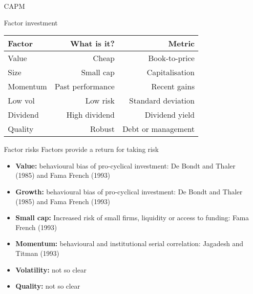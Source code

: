\documentclass[14pt,xcolor=pdftex,dvipsnames,table]{beamer}\usepackage[]{graphicx}\usepackage[]{color}
\begin{document}
\begin{frame}{CAPM}
\end{frame}

\begin{frame}{Factor investment}
\begin{table}
\begin{center}
\begin{tabular}{l r r }
\textbf{Factor} & \textbf{What is it?} & \textbf{Metric} \\
\hline
Value & Cheap & Book-to-price\\
Size & Small cap & Capitalisation\\
Momentum & Past performance & Recent gains\\
Low vol & Low risk & Standard deviation\\
Dividend & High dividend & Dividend yield\\
Quality & Robust & Debt or management\\
\end{tabular}
\end{center}
\end{table}
\end{frame}

\begin{frame}{Factor risks}
Factors provide a return for taking risk
\begin{itemize}[<+-| alert@+>]
\pause
  \item \textbf{Value:} behavioural bias of pro-cyclical investment: De Bondt and Thaler (1985) and Fama French (1993)
\item \textbf{Growth:} behavioural bias of pro-cyclical investment: De Bondt and Thaler (1985) and Fama French (1993)
\item \textbf{Small cap:} Increased risk of small firms, liquidity or access to funding: Fama French (1993)
\item \textbf{Momentum:} behavioural and institutional serial correlation: Jagadesh and Titman (1993)
\item \textbf{Volatility:} not so clear
\item \textbf{Quality:} not so clear
\end{itemize}
\end{frame}
\end{document}
